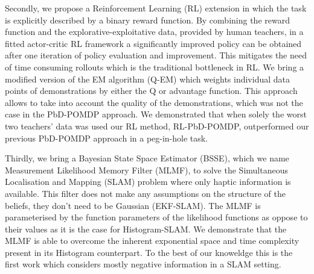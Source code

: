 Secondly, we propose a Reinforcement Learning (RL) extension in which the task is explicitly described by a binary reward 
function. By combining the reward function and the explorative-exploitative data, provided by human teachers, in 
a fitted actor-critic RL framework a significantly improved policy can be obtained after one iteration of policy evaluation
and improvement. This mitigates the need of time consuming rollouts which is the traditional bottleneck in RL.
We bring a modified version of the EM algorithm (Q-EM) which weights individual data points of demonstrations by 
either the Q or advantage function. This approach allows to take into account the quality of the demonstrations, which was not the case 
in the PbD-POMDP approach. We demonstrated that when solely the worst two teachers' data was used our RL method, RL-PbD-POMDP,
outperformed our previous PbD-POMDP approach in a peg-in-hole task. 



Thirdly, we bring a Bayesian State Space Estimator (BSSE), which we name Measurement Likelihood Memory Filter (MLMF), to solve 
the Simultaneous Localisation and Mapping (SLAM) problem where only haptic information is available.
This filter does not make any assumptions on the structure of the beliefs, they don't need to be Gaussian (EKF-SLAM). The MLMF is parameterised by the function parameters of the likelihood functions as oppose
to their values as it is the case for Histogram-SLAM. We demonstrate that the MLMF  is able to overcome the inherent exponential space and 
time complexity present in its Histogram counterpart. To the best of our knoweldge this is the first 
work which considers mostly negative information in a SLAM setting.



